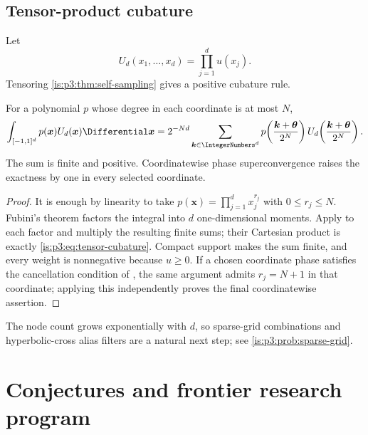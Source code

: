 \subsection{Tensor-product cubature}

Let
\begin{equation}
 U_d(x_1,\ldots,x_d)=\prod_{j=1}^{d}u(x_j).
 \label{is:p3:eq:tensor-density}
\end{equation}
Tensoring \cref{is:p3:thm:self-sampling} gives a positive cubature rule.

\begin{corollary}
\label{is:p3:cor:tensor-cubature}
For a polynomial $p$ whose degree in each coordinate is at most $N$,
\begin{equation}
 \int_{[-1,1]^d}p(\bm x)U_d(\bm x)\Differential\bm x
 =2^{-Nd}\sum_{\bm k\in\IntegerNumbers^d}
 p\!\left(\frac{\bm k+\bm\theta}{2^N}\right)
 U_d\!\left(\frac{\bm k+\bm\theta}{2^N}\right).
 \label{is:p3:eq:tensor-cubature}
\end{equation}
The sum is finite and positive.  Coordinatewise phase superconvergence raises the exactness by one in every selected coordinate.
\end{corollary}

\begin{proof}
It is enough by linearity to take
$p(\bm x)=\prod_{j=1}^{d}x_j^{r_j}$ with $0\le r_j\le N$.  Fubini's theorem
factors the integral into $d$ one-dimensional moments.  Apply
 to each factor and multiply the resulting
finite sums; their Cartesian product is exactly
\eqref{is:p3:eq:tensor-cubature}.  Compact support makes the sum finite, and
every weight is nonnegative because $u\ge0$.  If a chosen coordinate phase
satisfies the cancellation condition of
, the same argument admits
$r_j=N+1$ in that coordinate; applying this independently proves the final
coordinatewise assertion.
\end{proof}

The node count grows exponentially with $d$, so sparse-grid combinations and hyperbolic-cross alias filters are a natural next step; see \cref{is:p3:prob:sparse-grid}.

\section{Conjectures and frontier research program}
\label{is:p3:sec:frontier}

